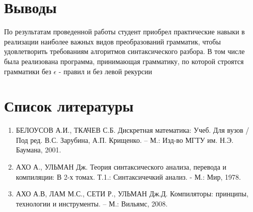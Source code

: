 
	\newpage
	\section{Выводы}
	
	По результатам проведенной работы студент приобрел практические навыки в реализации наиболее 
		важных видов преобразований грамматик, чтобы удовлетворить требованиям алгоритмов синтаксического разбора.
	В том числе была реализована программа, принимающая грамматику, по которой строятся грамматики 
		без $\epsilon$ - правил и без левой рекурсии


	\section{Список литературы}
		\begin{enumerate}
			\item БЕЛОУСОВ А.И., ТКАЧЕВ С.Б. Дискретная математика: Учеб. Для вузов / Под ред. В.С. Зарубина, А.П. Крищенко. – М.: Изд-во МГТУ им. Н.Э. Баумана, 2001.
			\item АХО А., УЛЬМАН Дж. Теория синтаксического анализа, перевода и компиляции: В 2-х томах. Т.1.: Синтаксичечкий анализ. - М.: Мир, 1978.
			\item АХО А.В, ЛАМ М.С., СЕТИ Р., УЛЬМАН Дж.Д. Компиляторы: принципы, технологии и инструменты. – М.: Вильямс, 2008.
		\end{enumerate}
	